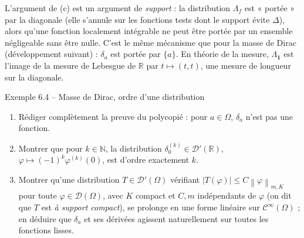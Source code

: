 \documentclass[11pt,a4paper]{article}
\newcommand{\R}{\mathbb{R}}
\newcommand{\N}{\mathbb{N}}
\newcommand{\norm}[1]{\left\|#1\right\|}
\newcommand{\Cinf}{\mathcal{C}^\infty}
\newcommand{\D}{\mathcal{D}}
\theoremstyle{definition}
\begin{document}
\begin{commentaire}
L'argument de (c) est un argument de \emph{support} : la distribution $\Lambda_f$ est « portée » par la diagonale (elle s'annule sur les fonctions tests dont le support évite $\Delta$), alors qu'une fonction localement intégrable ne peut être portée par un ensemble négligeable sans être nulle. C'est le même mécanisme que pour la masse de Dirac (développement suivant) : $\delta_a$ est portée par $\{a\}$. En théorie de la mesure, $\Lambda_{\mathbf 1}$ est l'image de la mesure de Lebesgue de $\R$ par $t\mapsto(t,t)$, une mesure de longueur sur la diagonale.
\end{commentaire}

\begin{exo}{Exemple 6.4 -- Masse de Dirac, ordre d'une distribution}
\begin{enumerate}[label=(\alph*)]
  \item Rédiger complètement la preuve du polycopié : pour $a\in\Omega$, $\delta_a$ n'est pas une fonction.
  \item Montrer que pour $k\in\N$, la distribution $\delta_0^{(k)}\in\D'(\R)$, $\varphi\mapsto(-1)^k\varphi^{(k)}(0)$, est d'ordre exactement $k$.
  \item Montrer qu'une distribution $T\in\D'(\Omega)$ vérifiant $|T(\varphi)|\le C\norm\varphi_{m,K}$ pour toute $\varphi\in\D(\Omega)$, avec $K$ compact et $C,m$ indépendants de $\varphi$ (on dit que $T$ est \emph{à support compact}), se prolonge en une forme linéaire sur $\Cinf(\Omega)$ ; en déduire que $\delta_a$ et ses dérivées agissent naturellement sur toutes les fonctions lisses.
\end{enumerate}
\end{exo}
\end{document}
